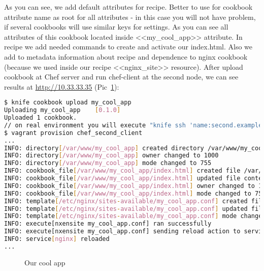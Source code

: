 As you can see, we add default attributes for recipe. Better to use for cookbook attribute name as root for all attributes - in this case you will not have problem, if several cookbooks will use similar keys for settings. As you can see all attributes of this cookbook located inside <<my\_cool\_app>> attribute. In recipe we add needed commands to create and activate our index.html. Also we add to metadata information about recipe and dependence to nginx cookbook (because we used inside our recipe <<nginx\_site>> resource). After upload cookbook at Chef server and run chef-client at the second node, we can see results at \href{http://10.33.33.35}{http://10.33.33.35} (Pic~\ref{fig:my_cool_app_index}):

\begin{lstlisting}[language=Bash,label=lst:cookbook-attributes8]
$ knife cookbook upload my_cool_app
Uploading my_cool_app    [0.1.0]
Uploaded 1 cookbook.
// on real environment you will execute "knife ssh 'name:second.example.com' 'sudo chef-client' -i ../keys/production.pem -x ubuntu"
$ vagrant provision chef_second_client
...
INFO: directory[/var/www/my_cool_app] created directory /var/www/my_cool_app
INFO: directory[/var/www/my_cool_app] owner changed to 1000
INFO: directory[/var/www/my_cool_app] mode changed to 755
INFO: cookbook_file[/var/www/my_cool_app/index.html] created file /var/www/my_cool_app/index.html
INFO: cookbook_file[/var/www/my_cool_app/index.html] updated file contents /var/www/my_cool_app/index.html
INFO: cookbook_file[/var/www/my_cool_app/index.html] owner changed to 1000
INFO: cookbook_file[/var/www/my_cool_app/index.html] mode changed to 755
INFO: template[/etc/nginx/sites-available/my_cool_app.conf] created file /etc/nginx/sites-available/my_cool_app.conf
INFO: template[/etc/nginx/sites-available/my_cool_app.conf] updated file contents /etc/nginx/sites-available/my_cool_app.conf
INFO: template[/etc/nginx/sites-available/my_cool_app.conf] mode changed to 644
INFO: execute[nxensite my_cool_app.conf] ran successfully
INFO: execute[nxensite my_cool_app.conf] sending reload action to service[nginx] (delayed)
INFO: service[nginx] reloaded
...
\end{lstlisting}

\begin{figure}[ht!]
  \caption{Our cool app}
  \label{fig:my_cool_app_index}
\end{figure}
